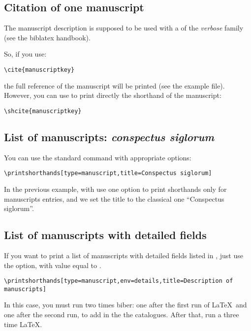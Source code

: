 \documentclass{ltxdockit}[2011/03/25]
\newcommand{\biblatex}{biblatex\xspace}
\begin{document}
\subsection{Citation of one manuscript}

The manuscript description is supposed to be used with a  of the \emph{verbose} family (see the \biblatex handbook).

So, if you use:
\begin{verbatim}
\cite{manuscriptkey}
\end{verbatim}

the full reference of the manuscript will be printed (see the example file). However, you can use  to print directly the shorthand of the manuscript:

\begin{verbatim}
\shcite{manuscriptkey}
\end{verbatim}

\subsection{List of manuscripts: \emph{conspectus siglorum}}

You can use the standard command  with appropriate options:

\begin{verbatim}
\printshorthands[type=manuscript,title=Conspectus siglorum]
\end{verbatim}

In the previous example, with use one option to print shorthands only for manuscripts entries, and we set the title to the classical one \enquote{Conspectus siglorum}.

\subsection{List of manuscripts with detailed fields}

If you want to print a list of manuscripts with detailed fields listed in , just use the  option, with value equal to
.

\begin{verbatim}
\printshorthands[type=manuscript,env=details,title=Description of manuscripts]
\end{verbatim}

In this case, you must run two times biber: one after the first run of \LaTeX\ and one after the second run, to add in the  the catalogues. After that, run a three time \LaTeX.
\end{document}
